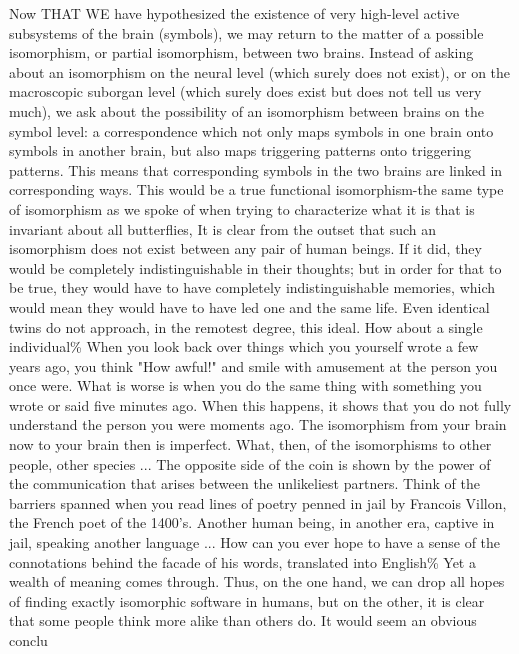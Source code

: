         Now THAT WE have hypothesized the existence of very high-level active
subsystems of the brain (symbols), we may return to the matter of a possible
isomorphism, or partial isomorphism, between two brains. Instead of asking about an
isomorphism on the neural level (which surely does not exist), or on the macroscopic
suborgan level (which surely does exist but does not tell us very much), we ask about the
possibility of an isomorphism between brains on the symbol level: a correspondence
which not only maps symbols in one brain onto symbols in another brain, but also maps
triggering patterns onto triggering patterns. This means that corresponding symbols in the
two brains are linked in corresponding ways. This would be a true functional
isomorphism-the same type of isomorphism as we spoke of when trying to characterize
what it is that is invariant about all butterflies,
        It is clear from the outset that such an isomorphism does not exist between any
pair of human beings. If it did, they would be completely indistinguishable in their
thoughts; but in order for that to be true, they would have to have completely
indistinguishable memories, which would mean they would have to have led one and the
same life. Even identical twins do not approach, in the remotest degree, this ideal.
        How about a single individual\% When you look back over things which you
yourself wrote a few years ago, you think "How awful!" and smile with amusement at the
person you once were. What is worse is when you do the same thing with something you
wrote or said five minutes ago. When this happens, it shows that you do not fully
understand the person you were moments ago. The isomorphism from your brain now to
your brain then is imperfect. What, then, of the isomorphisms to other people, other
species ...
        The opposite side of the coin is shown by the power of the communication that
arises between the unlikeliest partners. Think of the barriers spanned when you read lines
of poetry penned in jail by Francois Villon, the French poet of the 1400's. Another human
being, in another era, captive in jail, speaking another language ... How can you ever
hope to have a sense of the connotations behind the facade of his words, translated into
English\% Yet a wealth of meaning comes through.
        Thus, on the one hand, we can drop all hopes of finding exactly isomorphic
software in humans, but on the other, it is clear that some people think more alike than
others do. It would seem an obvious conclu





